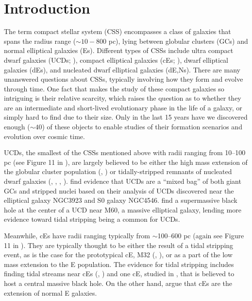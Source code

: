 \documentclass[iop,apj]{emulateapj}
\begin{document}
\maketitle

\section{Introduction}
\label{intro}

\noindent The term compact stellar system (CSS) encompasses a class of galaxies that spans the radius range ($\sim10 - 800$ pc), lying between globular clusters (GCs) and normal elliptical galaxies (Es). Different types of CSSs include ultra compact dwarf galaxies (UCDs; \citet{Phillipps2001}), compact elliptical galaxies (cEs; \citet{Faber1973}), dwarf elliptical galaxies (dEs), and nucleated dwarf elliptical galaxies (dE,Ns).  There are many unanswered questions about CSSs, typically involving how they form and evolve through time. One fact that makes the study of these compact galaxies so intriguing is their relative scarcity, which raises the question as to whether they are an intermediate and short-lived evolutionary phase in the life of a galaxy, or simply hard to find due to their size. Only in the last 15 years have we discovered enough ($\sim 40$) of these objects to enable studies of their formation scenarios and evolution over cosmic time.

UCDs, the smallest of the CSSs mentioned above with radii ranging from 10--100 pc (see Figure 11 in \citet{Norris2014}), are largely believed to be either the high mass extension of the globular cluster population (\citet{Drinkwater2000}, \citet{Mieske2002}) or tidally-stripped remnants of nucleated dwarf galaxies (\citet{Bekki2001}, \citet{Bekki2003}, \citet{Jennings2015}, \citet{Zhang2015}). \citet{Norris2011} find evidence that UCDs are a ``mixed bag'' of both giant GCs and stripped nuclei based on their analysis of UCDs discovered near the elliptical galaxy NGC3923 and S0 galaxy NGC4546. \citet{Seth2014} find a supermassive black hole at the center of a UCD near M60, a massive elliptical galaxy, lending more evidence toward tidal stripping being a common for UCDs.
 
Meanwhile, cEs have radii ranging typically from $\sim$100--600 pc (again see Figure 11 in \citet{Norris2014}). They are typically thought to be either the result of a tidal stripping event, as is the case for the prototypical cE, M32 (\citet{Choi2002}, \citet{Graham2002}), or as a part of the low mass extension to the E population. The evidence for tidal stripping includes finding tidal streams near cEs (\citet{SmithCastelli2008a}, \citet{Chilingarian2009}) and one cE, studied in \citet{Kormendy1997}, that is believed to host a central massive black hole. On the other hand, \citet{Kormendy2012a} argue that cEs are the extension of normal E galaxies.
\end{document}
